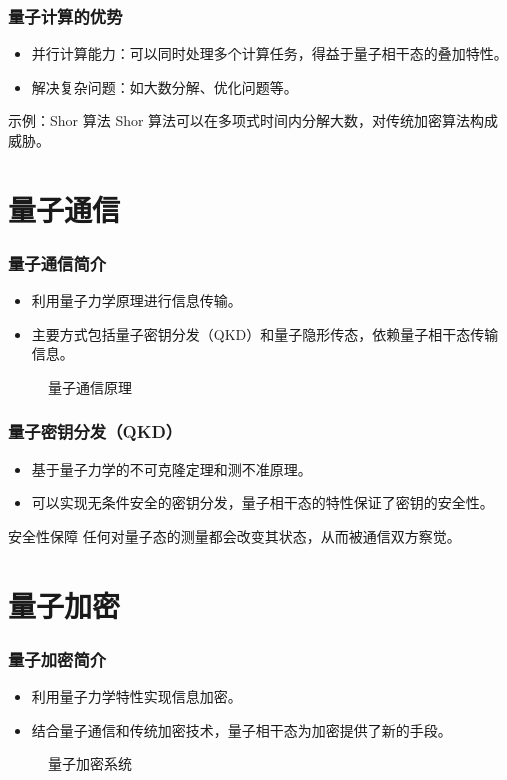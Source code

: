 \begin{frame}
    \frametitle{量子计算的优势}
    \begin{itemize}
        \item 并行计算能力：可以同时处理多个计算任务，得益于量子相干态的叠加特性。
        \item 解决复杂问题：如大数分解、优化问题等。
    \end{itemize}
    \begin{exampleblock}{示例：Shor 算法}
        Shor 算法可以在多项式时间内分解大数，对传统加密算法构成威胁。
    \end{exampleblock}
\end{frame}

\section{量子通信}
\begin{frame}
    \frametitle{量子通信简介}
    \begin{itemize}
        \item 利用量子力学原理进行信息传输。
        \item 主要方式包括量子密钥分发（QKD）和量子隐形传态，依赖量子相干态传输信息。
    \end{itemize}
    \begin{figure}
        \centering
        \caption{量子通信原理}
    \end{figure}
\end{frame}

\begin{frame}
    \frametitle{量子密钥分发（QKD）}
    \begin{itemize}
        \item 基于量子力学的不可克隆定理和测不准原理。
        \item 可以实现无条件安全的密钥分发，量子相干态的特性保证了密钥的安全性。
    \end{itemize}
    \begin{alertblock}{安全性保障}
        任何对量子态的测量都会改变其状态，从而被通信双方察觉。
    \end{alertblock}
\end{frame}

\section{量子加密}
\begin{frame}
    \frametitle{量子加密简介}
    \begin{itemize}
        \item 利用量子力学特性实现信息加密。
        \item 结合量子通信和传统加密技术，量子相干态为加密提供了新的手段。
    \end{itemize}
    \begin{figure}
        \centering
        \caption{量子加密系统}
    \end{figure}
\end{frame}


